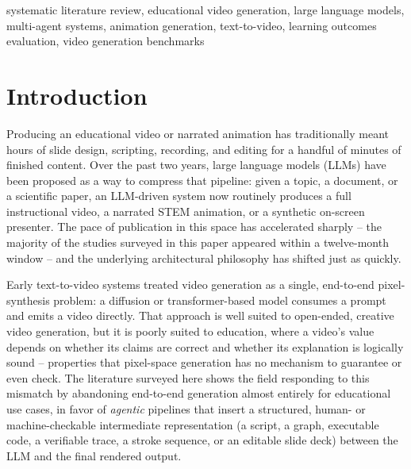 \documentclass[journal]{IEEEtran}
\begin{document}
\begin{abstract}
student-perceived quality judgments; the remainder evaluate the generated artifact, not the learner. This is a meaningful increase over the two such studies (one controlled learning-outcome study, one classroom deployment) identified in a narrower first-round search, but the underlying imbalance -- roughly one in eight studies measuring a learning outcome -- persists even as the field's technical sophistication grows quickly. We argue this evaluation gap is the field's most consequential open problem and outline concrete next steps -- cross-system human-subject studies, validation of LLM-as-judge knowledge-transfer proxies against human performance, dedicated factuality and accessibility metrics, and a shared benchmark analogous to VBench but for pedagogical effectiveness -- that would close it.
\end{abstract}

\begin{IEEEkeywords}
systematic literature review, educational video generation, large language models, multi-agent systems, animation generation, text-to-video, learning outcomes evaluation, video generation benchmarks
\end{IEEEkeywords}

\section{Introduction}
\label{sec:intro}

Producing an educational video or narrated animation has traditionally meant hours of slide design, scripting, recording, and editing for a handful of minutes of finished content. Over the past two years, large language models (LLMs) have been proposed as a way to compress that pipeline: given a topic, a document, or a scientific paper, an LLM-driven system now routinely produces a full instructional video, a narrated STEM animation, or a synthetic on-screen presenter. The pace of publication in this space has accelerated sharply -- the majority of the studies surveyed in this paper appeared within a twelve-month window -- and the underlying architectural philosophy has shifted just as quickly.

Early text-to-video systems treated video generation as a single, end-to-end pixel-synthesis problem: a diffusion or transformer-based model consumes a prompt and emits a video directly. That approach is well suited to open-ended, creative video generation, but it is poorly suited to education, where a video's value depends on whether its claims are correct and whether its explanation is logically sound -- properties that pixel-space generation has no mechanism to guarantee or even check. The literature surveyed here shows the field responding to this mismatch by abandoning end-to-end generation almost entirely for educational use cases, in favor of \emph{agentic} pipelines that insert a structured, human- or machine-checkable intermediate representation (a script, a graph, executable code, a verifiable trace, a stroke sequence, or an editable slide deck) between the LLM and the final rendered output.
\end{document}
